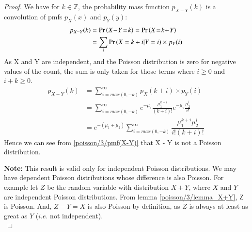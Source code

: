         \begin{proof}
             We have for $k \in \mathbb{Z}$, the probability mass function $p_{X-Y}(k)$ is a convolution of pmfs $p_X(x)$ and $p_Y(y)$: 
        \begin{align}
           p_{X-Y}(k) &= \pr{X\! -\! Y\! =\! k} = \pr{X\! =\! k\! +\! Y}\\
           &= \sum_{i}\pr{X = k + i| Y = i}\times p_Y(i)\label{poisson/3/p_(x-y)}
        \end{align}
        As X and Y are independent, and the Poisson distribution is zero for negative values of the count, the sum is only taken for those terms where $i \geq 0$ and $i+k\geq 0$. 
        \begin{align}
            p_{X-Y}(k) &= \sum_{i=max(0, -k)}^\infty p_X(k+i) \times p_Y(i)\\
            &=\sum_{i=max(0, -k)}^\infty e^{-\mu_1}\frac{\mu_1^{k+i}}{(k+i)!}e^{-\mu_2}\frac{\mu_2^i}{i!}\\
            &= e^{-(\mu_1 + \mu_2)}\sum_{i=max(0, -k)}^\infty \dfrac{\mu _{1}^{k+i}\mu _{2}^{i}}{i!(k+i)!}\label{poisson/3/pmf(X-Y)}
        \end{align}
        Hence we can see from \eqref{poisson/3/pmf(X-Y)} that X - Y is not a Poisson distribution.\\
        
        \par \textbf{Note: } This result is valid only for independent Poisson distributions. We may have dependent Poisson distributions whose difference is also Poisson. For example let $Z$ be the random variable with distribution $X + Y$, where $X$ and $Y$ are independent Poisson distributions. From lemma \eqref{poisson/3/lemma_X+Y}, Z is Poisson. And, $Z - Y = X$ is also Poisson by definition, as $Z$ is always at least as great as $Y$ ($i.e.$ not independent).\\
        \end{proof}
        
